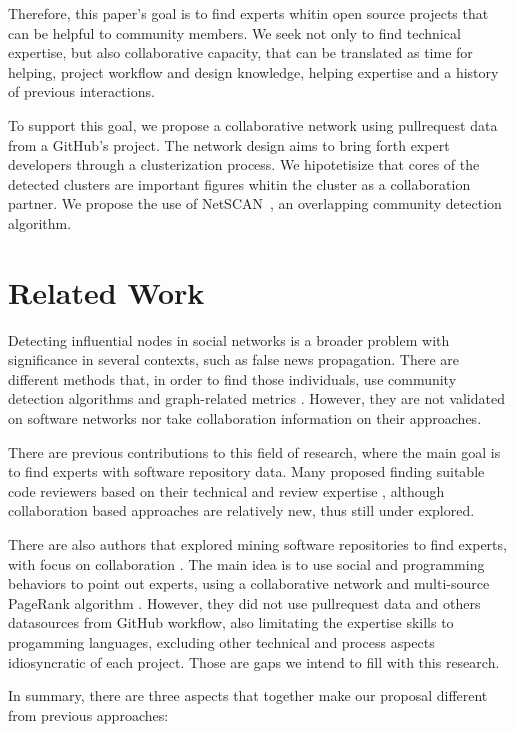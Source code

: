 \documentclass[conference]{IEEEtran}
\begin{document}
Therefore, this paper's goal is to find experts whitin open source projects that can be helpful to community members. We seek not only to find technical expertise, but also collaborative capacity, that can be translated as time for helping, project workflow and design knowledge, helping expertise and a history of previous interactions.

To support this goal, we propose a collaborative network using pullrequest data from a GitHub's project. The network design aims to bring forth expert developers through a clusterization process. We hipotetisize that cores of the detected clusters are important figures whitin the cluster as a collaboration partner. We propose the use of NetSCAN~\cite{horta2018}, an overlapping community detection algorithm.

\section{Related Work}

Detecting influential nodes in social networks is a broader problem with significance in several contexts, such as false news propagation\cite{johansson2017}. There are different methods that, in order to find those individuals, use community detection algorithms and graph-related metrics \cite{jalayer2018, simsek2018}. However, they are not validated on software networks nor take collaboration information on their approaches.

There are previous contributions to this field of research, where the main goal is to find experts with software repository data. Many proposed finding suitable code reviewers based on their technical and review expertise \cite{yu2014,xia2017}, although collaboration based approaches \cite{ouni2016,zanjani2016} are relatively new, thus still under explored.

There are also authors that explored mining software repositories to find experts, with focus on collaboration \cite{mo2015}. The main idea is to use social and programming behaviors to point out experts, using a collaborative network and multi-source PageRank algorithm \cite{page1998}. However, they did not use pullrequest data and others datasources from GitHub workflow, also limitating the expertise skills to progamming languages, excluding other technical and process aspects idiosyncratic of each project. Those are gaps we intend to fill with this research.

In summary, there are three aspects that together make our proposal different from previous approaches:
\end{document}
